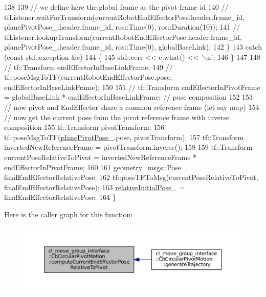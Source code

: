 \begin{DoxyCode}
138 
139             \textcolor{comment}{// we define here the global frame as the pivot frame id}
140             \textcolor{comment}{// tfListener.waitForTransform(currentRobotEndEffectorPose.header.frame\_id,
       planePivotPose\_.header.frame\_id, ros::Time(0), ros::Duration(10));}
141             \textcolor{comment}{// tfListener.lookupTransform(currentRobotEndEffectorPose.header.frame\_id,
       planePivotPose\_.header.frame\_id, ros::Time(0), globalBaseLink);}
142         \}
143         \textcolor{keywordflow}{catch} (\textcolor{keyword}{const} std::exception &e)
144         \{
145             std::cerr << e.what() << \textcolor{charliteral}{'\(\backslash\)n'};
146         \}
147 
148         \textcolor{comment}{// tf::Transform endEffectorInBaseLinkFrame;}
149         \textcolor{comment}{// tf::poseMsgToTF(currentRobotEndEffectorPose.pose, endEffectorInBaseLinkFrame);}
150 
151         \textcolor{comment}{// tf::Transform endEffectorInPivotFrame = globalBaseLink * endEffectorInBaseLinkFrame; // pose
       composition}
152 
153         \textcolor{comment}{// now pivot and EndEffector share a common reference frame (let say map)}
154         \textcolor{comment}{// now get the current pose from the pivot reference frame with inverse composition}
155         tf::Transform pivotTransform;
156         tf::poseMsgToTF(\hyperlink{classcl__move__group__interface_1_1CbCircularPivotMotion_a0994efbe93b9f9a61fcf3703c360cda2}{planePivotPose\_}.pose, pivotTransform);
157         tf::Transform invertedNewReferenceFrame = pivotTransform.inverse();
158 
159         tf::Transform currentPoseRelativeToPivot = invertedNewReferenceFrame * endEffectorInPivotFrame;
160 
161         geometry\_msgs::Pose finalEndEffectorRelativePose;
162         tf::poseTFToMsg(currentPoseRelativeToPivot, finalEndEffectorRelativePose);
163         \hyperlink{classcl__move__group__interface_1_1CbCircularPivotMotion_a1b2cc65d2f27a4dec54c20f1f00d4bb8}{relativeInitialPose\_} = finalEndEffectorRelativePose;
164     \}
\end{DoxyCode}
Here is the caller graph for this function\+:
\nopagebreak
\begin{figure}[H]
\begin{center}
\leavevmode
\includegraphics[width=350pt]{classcl__move__group__interface_1_1CbCircularPivotMotion_a147d7113ed686709dc2d362e56a95ad9_icgraph}
\end{center}
\end{figure}
